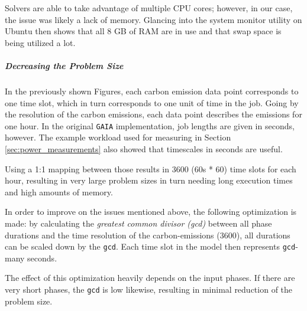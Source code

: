 Solvers are able to take advantage of multiple CPU cores; however, in our case, the issue was likely a lack of memory. 
Glancing into the system monitor utility on Ubuntu then shows that all 8 GB of RAM are in use and that swap space is being utilized a lot.

\subparagraph{Decreasing the Problem Size}

In the previously shown Figures, each carbon emission data point corresponds to one time slot, which in turn corresponds to one unit of time in the job. 
Going by the resolution of the carbon emissions, each data point describes the emissions for one hour. 
In the original \verb|GAIA| implementation, job lengths are given in seconds, however. 
The example workload used for measuring in Section \ref{sec:power_measurements} also showed that timescales in seconds are useful. 

Using a 1:1 mapping between those results in 3600 (60s * 60) time slots for each hour, resulting in very large problem sizes in turn needing long execution times and high amounts of memory.

In order to improve on the issues mentioned above, the following optimization is made: by calculating the \emph{greatest common divisor (gcd)} between all phase durations and the time resolution of the carbon-emissions (3600), all durations can be scaled down by the \verb|gcd|. Each time slot in the model then represents \verb|gcd|-many seconds.

The effect of this optimization heavily depends on the input phases. 
If there are very short phases, the \verb|gcd| is low likewise, resulting in minimal reduction of the problem size.
